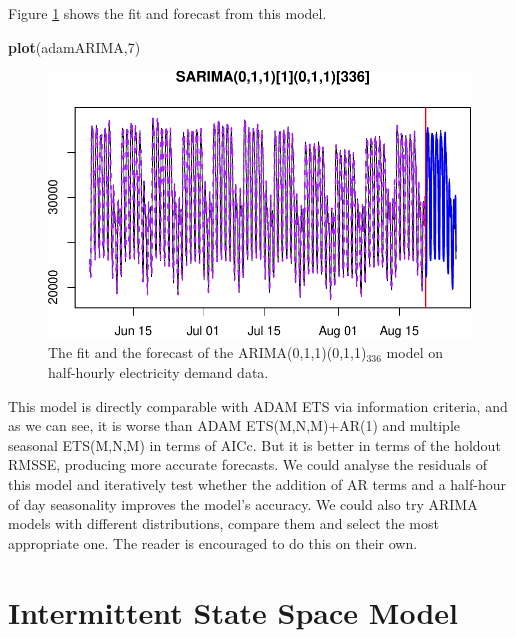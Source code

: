 \documentclass[]{book}
\newenvironment{Shaded}{\begin{snugshade}}{\end{snugshade}}
\newcommand{\DecValTok}[1]{\textcolor[rgb]{0.00,0.00,0.81}{#1}}
\newcommand{\KeywordTok}[1]{\textcolor[rgb]{0.13,0.29,0.53}{\textbf{#1}}}
\newcommand{\NormalTok}[1]{#1}
\theoremstyle{definition}
\theoremstyle{definition}
\theoremstyle{definition}
\theoremstyle{definition}
\theoremstyle{remark}
\begin{document}
Figure \ref{fig:adamARIMA} shows the fit and forecast from this model.

\begin{Shaded}
\begin{Highlighting}[]
\KeywordTok{plot}\NormalTok{(adamARIMA,}\DecValTok{7}\NormalTok{)}
\end{Highlighting}
\end{Shaded}

\begin{figure}
\centering
\includegraphics{Svetunkov--2022----ADAM_files/figure-latex/adamARIMA-1.pdf}
\caption{\label{fig:adamARIMA}The fit and the forecast of the ARIMA(0,1,1)(0,1,1)\(_{336}\) model on half-hourly electricity demand data.}
\end{figure}

This model is directly comparable with ADAM ETS via information criteria, and as we can see, it is worse than ADAM ETS(M,N,M)+AR(1) and multiple seasonal ETS(M,N,M) in terms of AICc. But it is better in terms of the holdout RMSSE, producing more accurate forecasts. We could analyse the residuals of this model and iteratively test whether the addition of AR terms and a half-hour of day seasonality improves the model's accuracy. We could also try ARIMA models with different distributions, compare them and select the most appropriate one. The reader is encouraged to do this on their own.

\hypertarget{ADAMIntermittent}{%
\chapter{Intermittent State Space Model}\label{ADAMIntermittent}}
\end{document}
